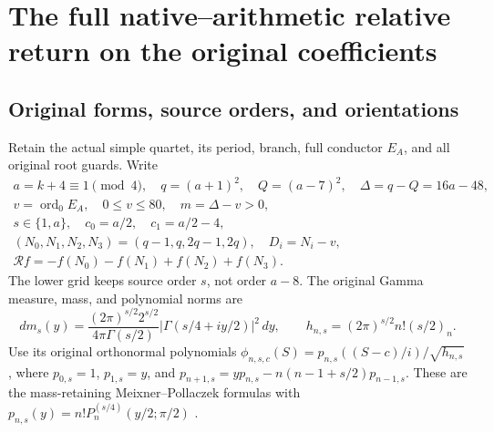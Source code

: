 \section{The full native--arithmetic relative return on the original coefficients}

\subsection{Original forms, source orders, and orientations}
Retain the actual simple quartet, its period, branch, full conductor
$E_A$, and all original root guards. Write
\begin{equation}\tag{NMR1}\label{a03cm:nmr:domain}
\begin{gathered}
a=k+4\equiv1\pmod4,\quad q=(a+1)^2,\quad Q=(a-7)^2,\quad
\Delta=q-Q=16a-48,\\ v=\operatorname{ord}_0E_A,\quad
0\leq v\leq80,\quad m=\Delta-v>0,\\
s\in\{1,a\},\quad c_0=a/2,\quad c_1=a/2-4,\\
(N_0,N_1,N_2,N_3)=(q-1,q,2q-1,2q),\quad D_i=N_i-v,\\
\mathcal R f=-f(N_0)-f(N_1)+f(N_2)+f(N_3).
\end{gathered}
\end{equation}
The lower grid keeps source order $s$, not order $a-8$.
The original Gamma measure, mass, and polynomial norms are
\begin{equation}\tag{NMR2}\label{a03cm:nmr:gamma}
dm_s(y)=\frac{(2\pi)^{s/2}2^{s/2}}{4\pi\Gamma(s/2)}
 |\Gamma(s/4+iy/2)|^2\,dy,\qquad
h_{n,s}=(2\pi)^{s/2}n!(s/2)_n .
\end{equation}
Use its original orthonormal polynomials
$\phi_{n,s,c}(S)=p_{n,s}((S-c)/i)/\sqrt{h_{n,s}}$,
where $p_{0,s}=1$, $p_{1,s}=y$, and
$p_{n+1,s}=yp_{n,s}-n(n-1+s/2)p_{n-1,s}$.
These are the mass-retaining Meixner--Pollaczek formulas with
$p_{n,s}(y)=n!P_n^{(s/4)}(y/2;\pi/2)$
\cite{a03cm:human:dlmf18}.

